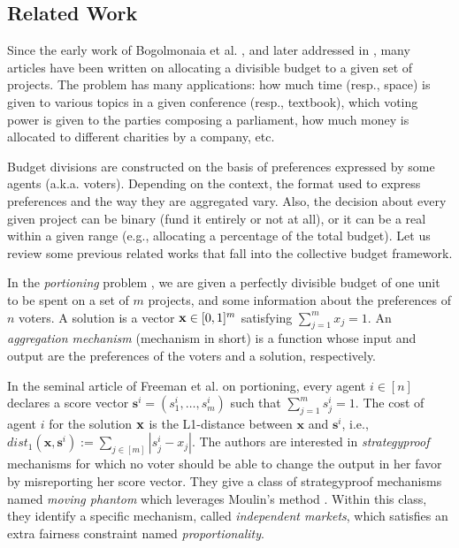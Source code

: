 \documentclass{article}
\begin{document}
\subsection{Related Work}

Since the early work of Bogolmonaia et al. \cite{BogomolnaiaMS05}, and later addressed in \cite{ABM20}, many articles have been written on allocating a divisible budget to a given set of projects. The problem has many applications: how much time (resp., space) 
is given to various topics in a given conference (resp., textbook),  which voting power is given to the parties composing a parliament, how much money is allocated to different charities by a company, etc.     


Budget divisions are constructed on the basis of preferences expressed by some agents (a.k.a. voters). Depending on the context, the format used to express preferences and the way they are aggregated vary. Also, the decision about every given project can be binary (fund it entirely or not at all), or it can be a real %
within a given range (e.g., allocating a percentage of the total budget).     
Let us review some previous related works that fall into the collective budget framework.   



In the \emph{portioning} problem \cite{MPS20,FPPV21,EST23,AACKLP23,GoyalSSG23,CCP24,FS24}, we are given a perfectly divisible budget of one unit to be spent on a set of $m$ projects, and some information about the preferences of $n$ voters. A solution is a vector ${\bf x} \in [0,1]^m$ satisfying $\sum_{j=1}^m x_j=1$. An \emph{aggregation mechanism} (mechanism in short) is a function whose input and output are the preferences of the voters and a solution, respectively.



In the seminal article of Freeman et al. \cite{FPPV21} on portioning, every agent $i \in [n]$ declares a score vector $\textbf{s}^i=(s^i_1, \ldots,s^i_m)$ such that $\sum_{j=1}^m s^i_j=1$. The cost of agent $i$ for the solution ${\bf x}$  is the L1-distance between $\textbf{x}$ and $\textbf{s}^i$, i.e.,  $dist_1(\textbf{x},\textbf{s}^i):=\sum_{j \in [m]} |s^i_j - x_j|$. The authors are interested in \emph{strategyproof} mechanisms for which no voter  should be able to change the output in her favor by misreporting her score vector. They give a class of strategyproof mechanisms named \emph{moving phantom} which leverages Moulin's method \cite{moulin1980strategy}. Within this class, they identify a specific mechanism, called \emph{independent markets}, which satisfies an extra fairness constraint named \emph{proportionality}.         
\end{document}
